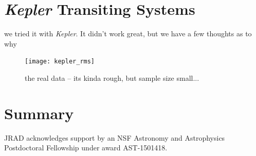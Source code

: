 \documentclass[preprint2]{aastex62}
\newcommand{\Kepler}{\textsl{Kepler}\xspace}
\begin{document}
%
%
%









\section{\Kepler Transiting Systems}
we tried it with \Kepler. It didn't work great, but we have a few thoughts as to why

\begin{figure}[!t]
\centering
\texttt{[image: kepler\_rms]}
\caption{
the real data -- its kinda rough, but sample size small...
}
\label{fig:rms}
\end{figure}



\section{Summary}
\label{sec:summary}





\acknowledgments

JRAD acknowledges support by an NSF Astronomy and Astrophysics Postdoctoral Fellowship under award AST-1501418. 



\end{document}
